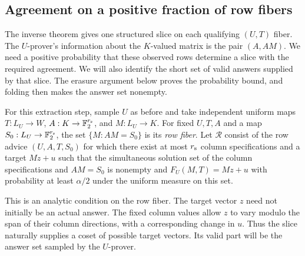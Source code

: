 \subsection{Agreement on a positive fraction of row fibers}

The inverse theorem gives one structured slice on each qualifying
$(U,T)$ fiber.  The $U$-prover's information about the $K$-valued matrix
is the pair $(A,AM)$.  We need a positive probability that these observed rows determine
a slice with the required agreement.  We will also identify the short set of valid answers
supplied by that slice.  The erasure argument below proves the probability
bound, and folding then makes the answer set nonempty.

For this extraction step, sample $U$ as before and take independent uniform
maps $T:L_U\to W$, $A:K\to\mathbb F_2^{r_{\rm s}}$, and $M:L_U\to K$.
For fixed $U,T,A$ and a map
$S_0:L_U\to\mathbb F_2^{r_{\rm s}}$, the set $\{M:AM=S_0\}$ is its
\emph{row fiber}.  Let $\mathcal R$ consist of the row advice $(U,A,T,S_0)$ for which there exist
at most $r_{\rm s}$ column specifications and a target $Mz+u$ such that
the simultaneous solution set of the column specifications and $AM=S_0$
is nonempty and $F_U(M,T)=Mz+u$ with probability at least $\alpha/2$
under the uniform measure on this set.

This is an analytic condition on the row fiber.  The target vector $z$
need not initially be an actual answer.  The fixed column values allow
$z$ to vary modulo the span of their column directions, with a corresponding
change in $u$.  Thus the slice naturally supplies a coset of possible
target vectors.  Its valid part will be the answer set sampled by the
$U$-prover.

